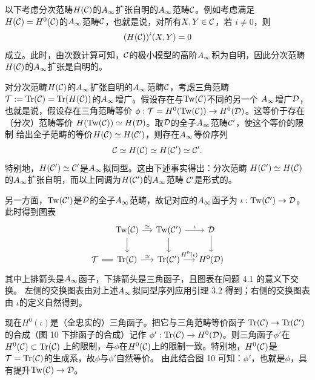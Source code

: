 以下考虑分次范畴$H(\mathcal{C})$的$A_{\infty}$扩张自明的$A_{\infty}$范畴$\mathcal{C}$。例如考虑满足
$H(\mathcal{C})=H^{0}(\mathcal{C})$的$A_{\infty}$范畴$\mathcal{C}$，也就是说，对所有$X,Y\in\mathcal{C}$，若
$i\neq0$，则
\begin{equation}
  (H(\mathcal{C}))^{i}(X,Y)=0
  \label{eq:c06-9}
\end{equation}
成立。此时，由次数计算可知，$\mathcal{C}$的极小模型的高阶$A_{\infty}$积为自明，因此分次范畴
$H(\mathcal{C})$的$A_{\infty}$扩张是自明的。


对分次范畴$H(\mathcal{C})$的$A_{\infty}$扩张自明的$A_{\infty}$范畴$\mathcal{C}$，考虑三角范畴
$\mathcal{T}:=\operatorname{Tr}(\mathcal{C})=\operatorname{Tr}(H(\mathcal{C}))$的$A_{\infty}$增广。假设存在与$\operatorname{Tw}(\mathcal{C})$不同的另一个
$A_{\infty}$增广$\mathcal{D}$，也就是说，假设存在三角范畴等价
$\phi:\mathcal{T}=H^{0}(\operatorname{Tw}(\mathcal{C}))\to H^{0}(\mathcal{D})$。这等价于存在（分次）范畴等价
$H(\operatorname{Tw}(\mathcal{C}))\simeq H(\mathcal{D})$。取$\mathcal{D}$的全子$A_{\infty}$范畴$\mathcal{C}'$，使这个等价的限制
给出全子范畴的等价$H(\mathcal{C})\simeq H(\mathcal{C}')$，则存在$A_{\infty}$等价序列
\[
  \mathcal{C}\simeq H(\mathcal{C})\simeq H(\mathcal{C}')\simeq\mathcal{C}'.
\]
特别地，$H(\mathcal{C}')\simeq\mathcal{C}'$是$A_{\infty}$拟同型。这由下述事实得出：分次范畴
$H(\mathcal{C}')\simeq H(\mathcal{C})$的$A_{\infty}$扩张自明，而以上同调为$H(\mathcal{C}')$的$A_{\infty}$范畴
$\mathcal{C}'$是形式的。

另一方面，$\operatorname{Tw}(\mathcal{C}')$是$\mathcal{D}$的全子$A_{\infty}$范畴，故记对应的$A_{\infty}$函子为
$\iota:\operatorname{Tw}(\mathcal{C}')\to\mathcal{D}$。此时得到图表
\begin{equation}
\begin{tikzcd}[column sep=1.2em, row sep=1.7em]
  {} & \Tw(\cC) \arrow[r,"\simeq"] \arrow[d]
  & \Tw(\cC') \arrow[r,"\iota"] \arrow[d]
  & \cD \arrow[d] \\
  \cT \arrow[r,equal] & \Tr(\cC) \arrow[r,"\simeq"]
  & \Tr(\cC') \arrow[r,"H^{0}(\iota)"]
  & H^{0}(\cD)
\end{tikzcd}
\label{eq:c06-10}
\end{equation}
其中上排箭头是$A_{\infty}$函子，下排箭头是三角函子，且图表在问题 4.1 的意义下交换。
左侧的交换图表由对上述$A_{\infty}$拟同型序列应用引理 3.2 得到；右侧的交换图表由
$\iota$的定义自然得到。

现在$H^{0}(\iota)$是（全忠实的）三角函子。把它与三角范畴等价函子
$\operatorname{Tr}(\mathcal{C})\to\operatorname{Tr}(\mathcal{C}')$的合成（图 10 下排函子的合成）记作
$\phi':\operatorname{Tr}(\mathcal{C})\to H^{0}(\mathcal{D})$。则三角函子$\phi'$在$H^{0}(\mathcal{C})\subset\operatorname{Tr}(\mathcal{C})$
上的限制，与$\phi$在$H^{0}(\mathcal{C})$上的限制一致。特别地，$H^{0}(\mathcal{C})$是
$\mathcal{T}=\operatorname{Tr}(\mathcal{C})$的生成系，故$\phi$与$\phi'$自然等价。
由此结合图 10 可知：$\phi'$，也就是$\phi$，具有提升$\operatorname{Tw}(\mathcal{C})\to\mathcal{D}$。

